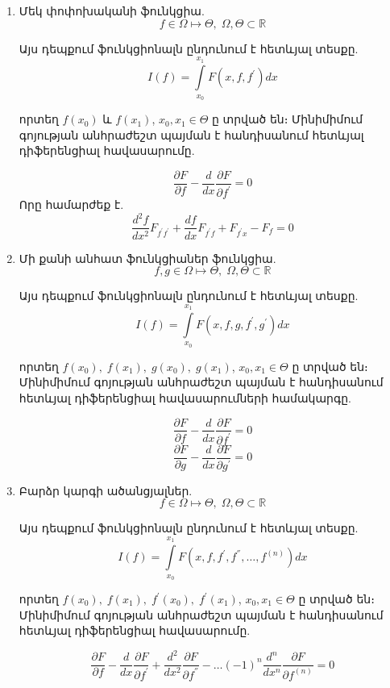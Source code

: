 \documentclass[fleqn, bachelor,subf,12pt,notitlepage]{disser}
\begin{document}
\begin{enumerate}

\item Մեկ փոփոխականի ֆունկցիա.
$$f \in \Omega \mapsto \Theta, \; \Omega, \Theta \subset \mathbb{R}$$

\noindent Այս դեպքում ֆունկցիոնալն ընդունում է հետևյալ տեսքը.
$$I\left(f\right) = \int\limits_{x_0}^{x_{1}} F\left(x, f, f^{'}\right)dx$$

\noindent որտեղ $f(x_{0})$ և $f(x_{1})$, $x_{0}, x_{1} \in \Theta$ ը տրված են։
\noindent Մինիմիմում գոյության անհրաժեշտ պայման է հանդիսանում հետևյալ դիֆերենցիալ հավասարումը.

$$\dfrac{\partial F}{\partial f} - \dfrac{d}{dx}\dfrac{\partial F}{\partial f^{'}}=0$$
Որը համարժեք է.
$$\dfrac{d^{2}f}{dx^{2}}F_{f^{'}f^{'}}+\dfrac{df}{dx}F_{f^{'}f} + F_{f^{'}x}-F_{f}=0$$

\item Մի քանի անհատ ֆունկցիաներ ֆունկցիա.
$$f,g \in \Omega \mapsto \Theta, \; \Omega, \Theta \subset \mathbb{R}$$

\noindent Այս դեպքում ֆունկցիոնալն ընդունում է հետևյալ տեսքը.
$$I\left(f\right) = \int\limits_{x_0}^{x_{1}} F\left(x, f, g, f^{'}, g^{'}\right)dx$$

\noindent որտեղ $f(x_{0}), \; f(x_{1}), \; g(x_{0}), \; g(x_{1})$, $x_{0}, x_{1} \in \Theta$ ը տրված են։
\noindent Մինիմիմում գոյության անհրաժեշտ պայման է հանդիսանում հետևյալ դիֆերենցիալ հավասարումների համակարգը.

$$\dfrac{\partial F}{\partial f} - \dfrac{d}{dx}\dfrac{\partial F}{\partial f^{'}}=0$$
$$\dfrac{\partial F}{\partial g} - \dfrac{d}{dx}\dfrac{\partial F}{\partial g^{'}}=0$$

\item Բարձր կարգի ածանցյալներ.
$$f \in \Omega \mapsto \Theta, \; \Omega, \Theta \subset \mathbb{R}$$

\noindent Այս դեպքում ֆունկցիոնալն ընդունում է հետևյալ տեսքը.
$$I\left(f\right) = \int\limits_{x_0}^{x_{1}} F\left(x, f, f^{'}, f^{''}, \dots, f^{(n)}\right)dx$$

\noindent որտեղ $f(x_{0}), \; f(x_{1}), \; f^{'}(x_{0}), \; f^{'}(x_{1})$, $x_{0}, x_{1} \in \Theta$ ը տրված են։
\noindent Մինիմիմում գոյության անհրաժեշտ պայման է հանդիսանում հետևյալ դիֆերենցիալ հավասարումը.

$$\dfrac{\partial F}{\partial f} - \dfrac{d}{dx}\dfrac{\partial F}{\partial f^{'}} + \dfrac{d^{2}}{dx^{2}}\dfrac{\partial F}{\partial f^{''}} - \dots (-1)^{n}\dfrac{d^{n}}{dx^{n}}\dfrac{\partial F}{\partial f^{(n)}}=0$$



\end{enumerate}
\end{document}
